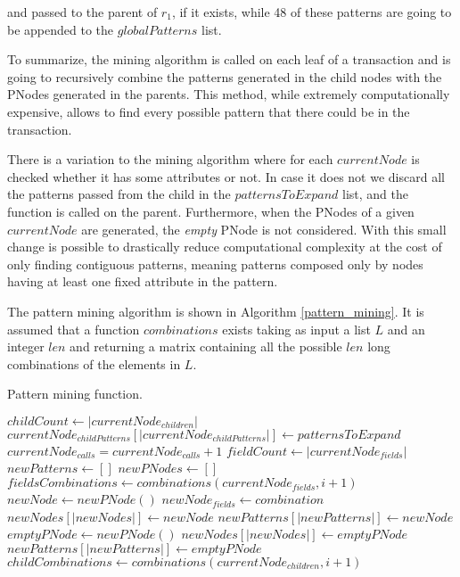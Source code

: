 \documentclass{acm_proc_article-sp-sigmod09}
\begin{document}
and passed to the parent of $r_1$, if it exists, while 48 of these patterns are going to be appended to the $globalPatterns$ list.

To summarize, the mining algorithm is called on each leaf of a transaction and is going to recursively combine the patterns generated in the child nodes with the PNodes generated in the parents. This method, while extremely computationally expensive, allows to find every possible pattern that there could be in the transaction.

There is a variation to the mining algorithm where for each $currentNode$ is checked whether it has some attributes or not. In case it does not we discard all the patterns passed from the child in the $patternsToExpand$ list, and the function is called on the parent. Furthermore, when the PNodes of a given $currentNode$ are generated, the \emph{empty} PNode is not considered. With this small change is possible to drastically reduce computational complexity at the cost of only finding contiguous patterns, meaning patterns composed only by nodes having at least one fixed attribute in the pattern.

The pattern mining algorithm is shown in Algorithm \ref{pattern_mining}. It is assumed that a function $combinations$ exists taking as input a list $L$ and an integer $len$ and returning a matrix containing all the possible $len$ long combinations of the elements in $L$.

\begin{algorithm}
\caption{Pattern mining function.}
\label{pattern_mining}
\begin{algorithmic}[1]
\State $childCount \gets |currentNode_{children}|$
    \State $currentNode_{childPatterns}[|currentNode_{childPatterns}|] \gets patternsToExpand$
\EndIf
\State $currentNode_{calls} = currentNode_{calls} + 1$
    \State $fieldCount \gets |currentNode_{fields}|$
    \State $newPatterns \gets []$
    \State $newPNodes \gets []$
            \State $fieldsCombinations \gets combinations(currentNode_{fields}, i + 1)$
                \State $newNode \gets new PNode()$
                \State $newNode_{fields} \gets combination$
                \State $newNodes[|newNodes|] \gets newNode$
                \State $newPatterns[|newPatterns|] \gets newNode$
            \EndFor
        \EndFor
    \EndIf
    \State $emptyPNode \gets new PNode()$
    \State $newNodes[|newNodes|] \gets emptyPNode$
    \State $newPatterns[|newPatterns|] \gets emptyPNode$
        \State $childCombinations \gets combinations(currentNode_{children}, i + 1)$
            
        \EndFor
    \EndFor
\EndIf
\EndFunction
\end{algorithmic}
\end{algorithm}
\end{document}
